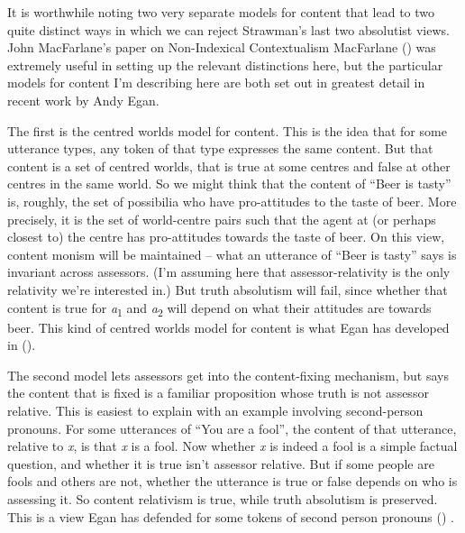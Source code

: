\documentclass[
  10pt,
  letterpaper,
  DIV=11,
  numbers=noendperiod,
  twoside]{scrartcl}
\begin{document}
It is worthwhile noting two very separate models for content that lead
to two quite distinct ways in which we can reject Strawman's last two
absolutist views. John MacFarlane's paper on Non-Indexical Contextualism
MacFarlane () was extremely
useful in setting up the relevant distinctions here, but the particular
models for content I'm describing here are both set out in greatest
detail in recent work by Andy Egan.

The first is the centred worlds model for content. This is the idea that
for some utterance types, any token of that type expresses the same
content. But that content is a set of centred worlds, that is true at
some centres and false at other centres in the same world. So we might
think that the content of ``Beer is tasty'' is, roughly, the set of
possibilia who have pro-attitudes to the taste of beer. More precisely,
it is the set of world-centre pairs such that the agent at (or perhaps
closest to) the centre has pro-attitudes towards the taste of beer. On
this view, content monism will be maintained -- what an utterance of
``Beer is tasty'' says is invariant across assessors. (I'm assuming here
that assessor-relativity is the only relativity we're interested in.)
But truth absolutism will fail, since whether that content is true for
\emph{a}\textsubscript{1} and \emph{a}\textsubscript{2} will depend on
what their attitudes are towards beer. This kind of centred worlds model
for content is what Egan has developed in
().

The second model lets assessors get into the content-fixing mechanism,
but says the content that is fixed is a familiar proposition whose truth
is not assessor relative. This is easiest to explain with an example
involving second-person pronouns. For some utterances of ``You are a
fool'', the content of that utterance, relative to \emph{x}, is that
\emph{x} is a fool. Now whether \emph{x} is indeed a fool is a simple
factual question, and whether it is true isn't assessor relative. But if
some people are fools and others are not, whether the utterance is true
or false depends on who is assessing it. So content relativism is true,
while truth absolutism is preserved. This is a view Egan has defended
for some tokens of second person pronouns
() .
\end{document}
